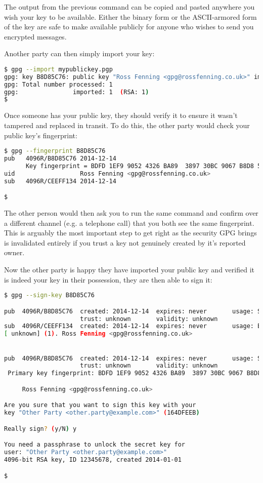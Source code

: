 \documentclass{report}
\begin{document}
The output from the previous command can be copied and pasted anywhere
you wish your key to be available. Either the binary form or the
ASCII-armored form of the key are safe to make available publicly for
anyone who wishes to send you encrypted messages.

Another party can then simply import your key:

\begin{lstlisting}[language=bash]
$ gpg --import mypublickey.pgp
gpg: key B8D85C76: public key "Ross Fenning <gpg@rossfenning.co.uk>" imported
gpg: Total number processed: 1
gpg:               imported: 1  (RSA: 1)
$
\end{lstlisting}

Once someone has your public key, they should verify it to ensure
it wasn't tampered and replaced in transit. To do this, the other
party would check your public key's fingerprint:

\begin{lstlisting}[language=bash]
$ gpg --fingerprint B8D85C76
pub   4096R/B8D85C76 2014-12-14
      Key fingerprint = BDFD 1EF9 9052 4326 BA89  3897 30BC 9067 B8D8 5C76
uid                  Ross Fenning <gpg@rossfenning.co.uk>
sub   4096R/CEEFF134 2014-12-14

$

\end{lstlisting}

The other person would then ask you to run the same command and confirm
over a different channel (e.g. a telephone call) that you both see
the same fingerprint. This is arguably the most important step to get
right as the security GPG brings is invalidated entirely if you
trust a key not genuinely created by it's reported owner.

Now the other party is happy they have imported your public key and
verified it is indeed your key in their possession, they are then
able to sign it:

\begin{lstlisting}[language=bash]
$ gpg --sign-key B8D85C76

pub  4096R/B8D85C76  created: 2014-12-14  expires: never       usage: SC  
                     trust: unknown       validity: unknown
sub  4096R/CEEFF134  created: 2014-12-14  expires: never       usage: E   
[ unknown] (1). Ross Fenning <gpg@rossfenning.co.uk>


pub  4096R/B8D85C76  created: 2014-12-14  expires: never       usage: SC  
                     trust: unknown       validity: unknown
 Primary key fingerprint: BDFD 1EF9 9052 4326 BA89  3897 30BC 9067 B8D8 5C76

     Ross Fenning <gpg@rossfenning.co.uk>

Are you sure that you want to sign this key with your
key "Other Party <other.party@example.com>" (164DFEEB)

Really sign? (y/N) y

You need a passphrase to unlock the secret key for
user: "Other Party <other.party@example.com>"
4096-bit RSA key, ID 12345678, created 2014-01-01

$
\end{lstlisting}
\end{document}
